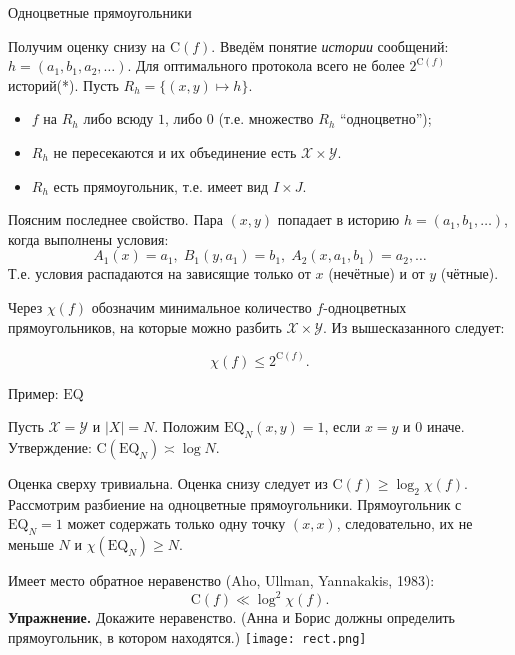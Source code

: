 \documentclass[handout]{beamer}
\renewcommand\le{\leqslant}
\renewcommand\ge{\geqslant}
\renewcommand\C{\mathrm{C}}
\begin{document}
\begin{frame}{Одноцветные прямоугольники}

    Получим оценку снизу на $\C(f)$. Введём понятие \textit{истории} сообщений:
    $h=(a_1,b_1,a_2,\ldots)$. Для оптимального протокола всего не более
    $2^{\C(f)}$ историй(*). Пусть $R_h=\{(x,y)\mapsto h\}$.
    \begin{itemize}
        \item $f$ на $R_h$ либо всюду $1$, либо $0$ (т.е. множество $R_h$
            ``одноцветно'');
        \item $R_h$ не пересекаются и их объединение есть $\mathcal
            X\times\mathcal Y$.
        \item $R_h$ есть прямоугольник, т.е. имеет вид $I\times J$.
    \end{itemize}
    \pause
    Поясним последнее свойство. Пара $(x,y)$ попадает в историю
    $h=(a_1,b_1,\ldots)$, когда
    выполнены условия:
    $$
    A_1(x) = a_1,\;B_1(y,a_1)=b_1,\;A_2(x,a_1,b_1)=a_2,\ldots
    $$
    Т.е. условия распадаются на зависящие только от $x$ (нечётные) и от $y$
    (чётные).
    \pause\vspace{5pt}

    Через $\chi(f)$ обозначим минимальное количество $f$-одноцветных
    прямоугольников, на которые можно разбить $\mathcal X\times\mathcal Y$.
    Из вышесказанного следует:

    $$
    \chi(f)\le 2^{\C(f)}.
    $$

\end{frame}

\begin{frame}{Пример: $\mathrm{EQ}$}

    Пусть $\mathcal X=\mathcal Y$ и $|X|=N$. Положим
    $\mathrm{EQ}_N(x,y)=1$, если $x=y$ и $0$ иначе. Утверждение:
    $\C(\mathrm{EQ}_N)\asymp \log N$.

    \pause\vspace{5pt}

    Оценка сверху тривиальна. Оценка снизу следует из $\C(f)\ge\log_2\chi(f)$.
    Рассмотрим разбиение на одноцветные прямоугольники. Прямоугольник с
    $\mathrm{EQ}_N=1$ может содержать только одну точку $(x,x)$, следовательно,
    их не меньше $N$ и $\chi(\mathrm{EQ}_N)\ge N$.

\end{frame}

\begin{frame}
    Имеет место обратное неравенство (Aho, Ullman, Yannakakis, 1983):
    $$
    \C(f)\ll \log^2\chi(f).
    $$
    \textbf{Упражнение.} Докажите неравенство. (Анна и Борис должны определить прямоугольник,
    в котором находятся.)
    \texttt{[image: rect.png]}
\end{frame}
\end{document}
